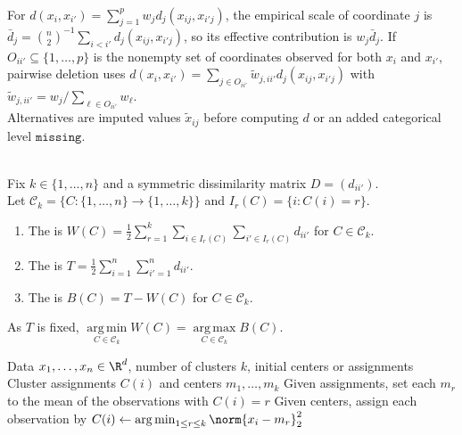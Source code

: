 \begin{remark} \label{rem:sl-clustering-weights-and-missingness} \\
For $d(x_i,x_{i'})=\sum\limits_{j=1}^p w_jd_j(x_{ij},x_{i'j})$, the empirical scale of coordinate $j$ is $\bar d_j=\binom{n}{2}^{-1}\sum\limits_{i<i'}d_j(x_{ij},x_{i'j})$, so its effective contribution is $w_j\bar d_j$. If $O_{ii'}\subseteq\{1,\ldots,p\}$ is the nonempty set of coordinates observed for both $x_i$ and $x_{i'}$, pairwise deletion uses $d(x_i,x_{i'})=\sum\limits_{j\in O_{ii'}}\tilde w_{j,ii'}d_j(x_{ij},x_{i'j})$ with $\tilde w_{j,ii'}=w_j/\sum\limits_{\ell\in O_{ii'}}w_\ell$.\\
Alternatives are imputed values $\tilde x_{ij}$ before computing $d$ or an added categorical level $\mathtt{missing}$.
\end{remark}

\begin{definition} \label{def:sl-clustering-within-between-scatter} \\
Fix $k\in\{1,\ldots,n\}$ and a symmetric dissimilarity matrix $D=(d_{ii'})$.\\
Let $\mathcal C_k=\{C:\{1,\ldots,n\}\to\{1,\ldots,k\}\}$ and $I_r(C)=\{i:C(i)=r\}$.
\begin{enumerate}[label=(\roman*)]
\setlength{\itemsep}{0pt}
\item The  is $W(C)=\frac{1}{2}\sum\limits_{r=1}^k\sum\limits_{i\in I_r(C)}\sum\limits_{i'\in I_r(C)}d_{ii'}$ for $C\in\mathcal C_k$.
\item The  is $T=\frac{1}{2}\sum\limits_{i=1}^n\sum\limits_{i'=1}^n d_{ii'}$.
\item The  is $B(C)=T-W(C)$ for $C\in\mathcal C_k$.
\end{enumerate}
As $T$ is fixed, $\operatorname*{arg\,min}\limits_{C\in\mathcal C_k}W(C)=\operatorname*{arg\,max}\limits_{C\in\mathcal C_k}B(C)$.
\end{definition}

\begin{breakablealgorithm}
\caption{$k$-Means Alternating Minimization}
\label{alg:sl-kmeans-alternating-minimization}
\begin{algorithmic}
\Require Data $x_1,\ldots,x_n\in\R^d$, number of clusters $k$, initial centers or assignments
\Ensure Cluster assignments $C(i)$ and centers $m_1,\ldots,m_k$
\Repeat
\State Given assignments, set each $m_r$ to the mean of the observations with $C(i)=r$
\State Given centers, assign each observation by $C(i)\gets \operatorname*{arg\,min}_{1\leq r\leq k}\norm{x_i-m_r}_2^2$
\end{algorithmic}
\end{breakablealgorithm}

